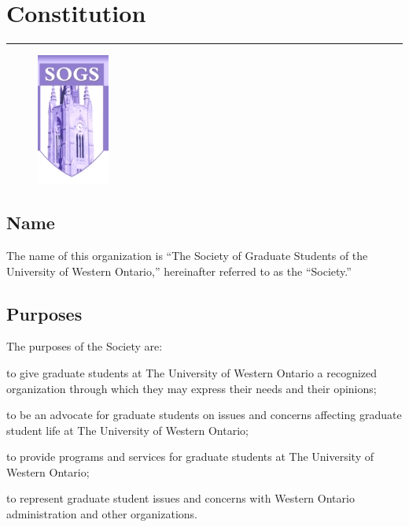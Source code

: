\chapter{Constitution}
\rule{\textwidth}{0.5pt}\vspace*{--\baselineskip}\vspace{3.2pt} %
\vfill


\begin{figure}
\centering
\includegraphics{logo.jpg}\\[1cm]
\end{figure}




\newpage


\section{Name}

The name of this organization is ``The Society of Graduate Students of the University of Western Ontario,'' hereinafter referred to as the ``Society.''  
 \newpage

\section{Purposes}

The purposes of the Society are:

	\begin{longenum}[ label*=\thesection.\arabic*., align=left]

 \item to give graduate students at The University of Western Ontario a recognized organization through which they may express their needs and their opinions;

 \item to be an advocate for graduate students on issues and concerns affecting graduate student life at The University of Western Ontario; 

 \item to provide programs and services for graduate students at The University of Western Ontario; 

 \item to represent graduate student issues and concerns with Western Ontario administration and other organizations.
   \end{longenum}

